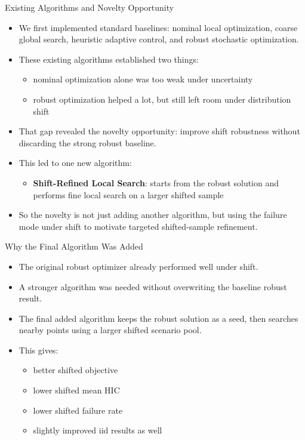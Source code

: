 \documentclass[aspectratio=169]{beamer}
\begin{document}
\begin{frame}{Existing Algorithms and Novelty Opportunity}
  \small
  \begin{itemize}
    \item We first implemented standard baselines: nominal local optimization, coarse global search, heuristic adaptive control, and robust stochastic optimization.
    \item These existing algorithms established two things:
    \begin{itemize}
      \item nominal optimization alone was too weak under uncertainty
      \item robust optimization helped a lot, but still left room under distribution shift
    \end{itemize}
    \item That gap revealed the novelty opportunity: improve shift robustness without discarding the strong robust baseline.
    \item This led to one new algorithm:
    \begin{itemize}
      \item \textbf{Shift-Refined Local Search}: starts from the robust solution and performs fine local search on a larger shifted sample
    \end{itemize}
    \item So the novelty is not just adding another algorithm, but using the failure mode under shift to motivate targeted shifted-sample refinement.
  \end{itemize}
\end{frame}

\begin{frame}{Why the Final Algorithm Was Added}
  \small
  \begin{itemize}
    \item The original robust optimizer already performed well under shift.
    \item A stronger algorithm was needed without overwriting the baseline robust result.
    \item The final added algorithm keeps the robust solution as a seed, then searches nearby points using a larger shifted scenario pool.
    \item This gives:
    \begin{itemize}
      \item better shifted objective
      \item lower shifted mean HIC
      \item lower shifted failure rate
      \item slightly improved iid results as well
    \end{itemize}
  \end{itemize}
\end{frame}
\end{document}
